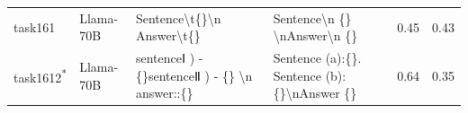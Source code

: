 \begin{longtable}{@{}p{0.8cm\tiny}p{1cm\tiny}p{4.1cm\ttfamily\tiny}p{4.1cm\ttfamily\tiny}p{0.8cm\tiny}p{0.8cm\tiny}@{}}
task161   & Llama-70B  & Sentence\textbackslash{}t\{\}\textbackslash{}n Answer\textbackslash{}t\{\}                                                                                                                                                                                                                                                                                                                                                                                                                                              & Sentence\textbackslash{}n \{\} \textbackslash{}nAnswer\textbackslash{}n \{\}                                                                                                                                                                                                                                                                                                                                                                                                                                                                                                      & 0.45 & 0.43 \\
task1612\textsuperscript{*}  & Llama-70B  & sentenceⅠ ) - \{\}sentenceⅡ ) - \{\} \textbackslash{}n answer::\{\}                                                                                                                                                                                                                                                                                                                                                                                                                                                     & Sentence  (a):\{\}. Sentence  (b):\{\}\textbackslash{}nAnswer \{\}                                                                                                                                                                                                                                                                                                                                                                                                                                                                                                                & 0.64 & 0.35 \\

\end{longtable}
